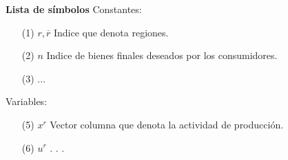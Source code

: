 \newpage
{}
 {\bf\LARGE Lista de símbolos}
 \vskip 1.5cm
Constantes: 
\begin{enumerate}
\item[(1)]$r,\overline{r} $ \hspace*{0.8cm} Indice que denota regiones.
\item[(2)] $n $ \hspace*{1.1cm} Indice de bienes finales deseados por los consumidores.
\item[(3)] ...
\vskip 3cm
\end{enumerate} 
\vskip 0.3cm
Variables:
\begin{enumerate}
\item[(5)] $ x^{r} $ \hspace*{1cm} Vector columna que denota la actividad de producción.
\item[(6)] $ u^{r} $ \hspace*{1.2cm} . . .
\end{enumerate}

